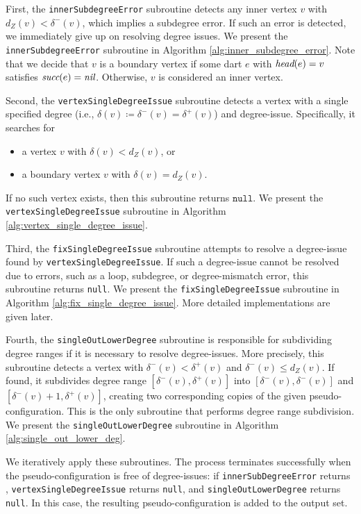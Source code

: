 \documentclass[main.tex]{subfiles}
\begin{document}
First, the \texttt{innerSubdegreeError} subroutine detects any inner vertex $v$ with $d_Z(v) < \delta^-(v)$, which implies a subdegree error.
If such an error is detected, we immediately give up on resolving degree issues.
We present the \texttt{innerSubdegreeError} subroutine in Algorithm \ref{alg:inner_subdegree_error}.
Note that we decide that $v$ is a boundary vertex if some dart $e$ with $\textit{head}(e)=v$ satisfies $\textit{succ}(e)=\textit{nil}$.
Otherwise, $v$ is considered an inner vertex.

Second, the \texttt{vertexSingleDegreeIssue} subroutine detects a vertex with a single specified degree (i.e., $\delta(v) \coloneq \delta^-(v)=\delta^+(v)$) and degree-issue.
Specifically, it searches for
\begin{itemize}
    \item a vertex $v$ with $\delta(v) < d_Z(v)$, or
    \item a boundary vertex $v$ with $\delta(v) = d_Z(v)$.
\end{itemize}
If no such vertex exists, then this subroutine returns $\texttt{null}$.
We present the \texttt{vertexSingleDegreeIssue} subroutine in Algorithm \ref{alg:vertex_single_degree_issue}.

Third, the \texttt{fixSingleDegreeIssue} subroutine attempts to resolve a degree-issue found by \texttt{vertexSingleDegreeIssue}.
If such a degree-issue cannot be resolved due to errors, such as a loop, subdegree, or degree-mismatch error, this subroutine returns \texttt{null}.
We present the \texttt{fixSingleDegreeIssue} subroutine in Algorithm \ref{alg:fix_single_degree_issue}.
More detailed implementations are given later.

Fourth, the \texttt{singleOutLowerDegree} subroutine is responsible for subdividing degree ranges if it is necessary to resolve degree-issues.
More precisely, this subroutine detects a vertex with $\delta^-(v) < \delta^+(v)$ and $\delta^-(v) \leq d_Z(v)$.
If found, it subdivides degree range $[\delta^-(v), \delta^+(v)]$ into $[\delta^-(v), \delta^-(v)]$ and $[\delta^-(v)+1, \delta^+(v)]$, creating two corresponding copies of the given pseudo-configuration.
This is the only subroutine that performs degree range subdivision.
We present the \texttt{singleOutLowerDegree} subroutine in Algorithm \ref{alg:single_out_lower_deg}.

We iteratively apply these subroutines.
The process terminates successfully when the pseudo-configuration is free of degree-issues:
if \texttt{innerSubDegreeError} returns \False, \texttt{vertexSingleDegreeIssue} returns \texttt{null}, and \texttt{singleOutLowerDegree} returns \texttt{null}.
In this case, the resulting pseudo-configuration is added to the output set.
\end{document}
